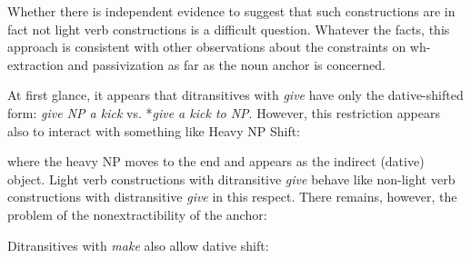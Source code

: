 Whether there is independent evidence to suggest that such constructions
are in fact not light verb constructions is a difficult question.  Whatever
the facts, this approach is consistent with other observations about the
constraints on wh-extraction and passivization as far as the noun anchor is
concerned.

\vspace{0.5in}  \vspace{0.25in}

At first glance, it appears that ditransitives with {\it give} have only
the dative-shifted form: {\it give NP a kick} vs. *{\it give a kick to NP}.
However, this restriction appears also to interact with something like
Heavy NP Shift:


where the heavy NP moves to the end and appears as the indirect (dative)
object.  Light verb constructions with ditransitive {\it give} behave like
non-light verb constructions with distransitive {\it give} in this respect.
There remains, however, the problem of the nonextractibility of the anchor:



Ditransitives with {\it make} also allow dative shift:




\vspace{0.5in}  \vspace{0.25in}

